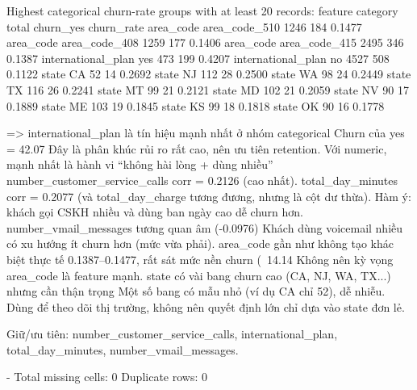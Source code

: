 Highest categorical churn-rate groups with at least 20 records:
           feature      category  total  churn_yes  churn_rate
         area_code area_code_510   1246        184      0.1477
         area_code area_code_408   1259        177      0.1406
         area_code area_code_415   2495        346      0.1387
international_plan           yes    473        199      0.4207
international_plan            no   4527        508      0.1122
             state            CA     52         14      0.2692
             state            NJ    112         28      0.2500
             state            WA     98         24      0.2449
             state            TX    116         26      0.2241
             state            MT     99         21      0.2121
             state            MD    102         21      0.2059
             state            NV     90         17      0.1889
             state            ME    103         19      0.1845
             state            KS     99         18      0.1818
             state            OK     90         16      0.1778

=> international_plan là tín hiệu mạnh nhất ở nhóm categorical
Churn của yes = 42.07%
Đây là phân khúc rủi ro rất cao, nên ưu tiên retention.
Với numeric, mạnh nhất là hành vi “không hài lòng + dùng nhiều”
number_customer_service_calls corr = 0.2126 (cao nhất).
total_day_minutes corr = 0.2077 (và total_day_charge tương đương, nhưng là cột dư thừa).
Hàm ý: khách gọi CSKH nhiều và dùng ban ngày cao dễ churn hơn.
number_vmail_messages tương quan âm (-0.0976)
Khách dùng voicemail nhiều có xu hướng ít churn hơn (mức vừa phải).
area_code gần như không tạo khác biệt thực tế
0.1387–0.1477, rất sát mức nền churn (~14.14%
Không nên kỳ vọng area_code là feature mạnh.
state có vài bang churn cao (CA, NJ, WA, TX...) nhưng cần thận trọng
Một số bang có mẫu nhỏ (ví dụ CA chỉ 52), dễ nhiễu.
Dùng để theo dõi thị trường, không nên quyết định lớn chỉ dựa vào state đơn lẻ.

Giữ/ưu tiên: number_customer_service_calls, international_plan, total_day_minutes, number_vmail_messages.

- Total missing cells: 0
Duplicate rows: 0

